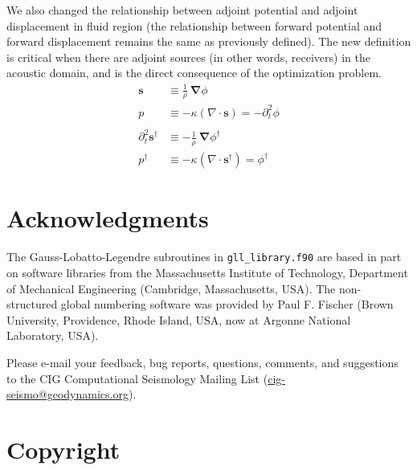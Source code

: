 \documentclass[oneside,english,onecolumn,letterpaper]{book}
\newcommand{\urlwithparentheses}[1]{(\url{#1})}
\begin{document}
We also changed the relationship between adjoint potential and adjoint displacement in fluid region
(the relationship between forward potential and forward displacement remains the same as previously defined).
The new definition is critical when there are adjoint sources (in other words, receivers) in the acoustic domain,
and is the direct consequence of the optimization problem.
%
\begin{align*}
\mathbf{s} &\equiv \frac{1}{\rho} \: \mathbf{\nabla}\phi \\
p &\equiv -\kappa\left(\nabla\cdot\mathbf{s}\right) = -\partial_t^2\phi \\
&\\
\partial_t^2\mathbf{s}^\dagger &\equiv -\frac{1}{\rho} \: \mathbf{\nabla}\phi^\dagger \\
p^\dagger &\equiv -\kappa\left(\nabla\cdot\mathbf{s}^\dagger\right) = \phi^\dagger
\end{align*}




\chapter*{Acknowledgments}


The Gauss-Lobatto-Legendre subroutines in \texttt{gll\_library.f90}
are based in part on software libraries from the Massachusetts Institute
of Technology, Department of Mechanical Engineering (Cambridge, Massachusetts, USA).
The non-structured global numbering software was provided by Paul
F. Fischer (Brown University, Providence, Rhode Island, USA, now at Argonne National Laboratory, USA).

Please e-mail your feedback, bug reports, questions, comments, and suggestions
to the CIG Computational Seismology Mailing List \urlwithparentheses{cig-seismo@geodynamics.org}.



\chapter*{Copyright}

\end{document}
